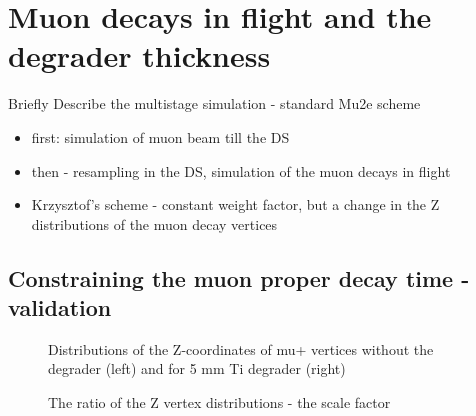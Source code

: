 \section {Muon decays in flight and the degrader thickness}

{\red Briefly Describe the multistage simulation - standard Mu2e scheme
  \begin{itemize}
  \item
    first: simulation of muon beam till the DS
  \item
    then - resampling in the DS, simulation of the muon decays in flight
  \item
    Krzysztof's scheme - constant weight factor, but a change in the Z distributions
    of the muon decay vertices
  \end{itemize}
}


\subsection {Constraining the muon proper decay time - validation}

\begin{figure}[H]
  \caption{
    \label{fig:pion_stop_time}
    Distributions of the Z-coordinates of mu+ vertices without the degrader (left)
    and for 5 mm Ti degrader (right)
  }
\end{figure}

\begin{figure}[H]
  \caption{
    \label{fig:pion_stop_time}
    The ratio of the Z vertex distributions - the scale factor
  }
\end{figure}


